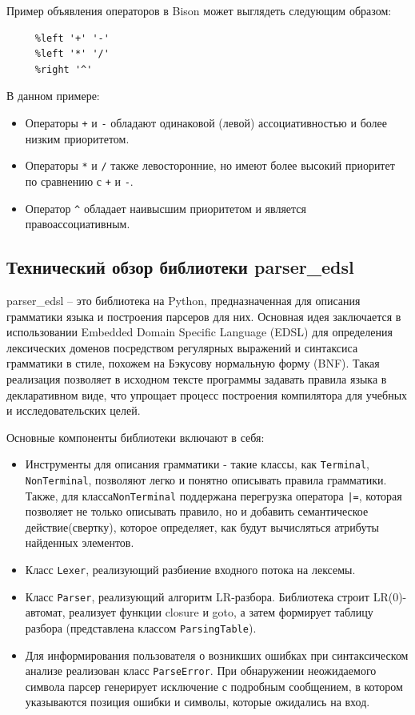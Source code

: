 \documentclass[14pt, russian]{scrartcl}
\begin{document}
Пример объявления операторов в Bison может выглядеть следующим образом:

\begin{verbatim}
	 %left '+' '-'
	 %left '*' '/'
	 %right '^'
\end{verbatim}

В данном примере:
\begin{itemize}
	\item Операторы \verb|+| и \verb|-| обладают одинаковой (левой)
	ассоциативностью и более низким приоритетом.
	\item Операторы \verb|*| и \verb|/| также левосторонние,
	но имеют более высокий приоритет по сравнению с \verb|+| и \verb|-|.
	\item Оператор \verb|^| обладает
	наивысшим приоритетом и является правоассоциативным.
\end{itemize}

\subsection{Технический обзор библиотеки parser\_edsl}

parser\_edsl – это библиотека на Python, предназначенная для описания грамматики языка и построения парсеров для них.
 Основная идея заключается в использовании Embedded Domain Specific Language (EDSL)
для определения лексических доменов посредством регулярных выражений и синтаксиса грамматики в стиле, похожем
на Бэкусову нормальную форму (BNF). Такая реализация позволяет в исходном тексте программы задавать правила
языка в декларативном виде, что упрощает процесс построения компилятора для учебных и исследовательских целей.

Основные компоненты библиотеки включают в себя:

\begin{itemize}
	\item Инструменты для описания грамматики - такие классы, как \texttt{Terminal}, \texttt{NonTerminal}, позволяют легко и понятно описывать правила грамматики.
		Также, для класса\texttt{NonTerminal} поддержана перегрузка оператора \texttt{|=}, которая позволяет не только описывать
		правило, но и добавить семантическое действие(свертку), которое определяет, как будут
		вычисляться атрибуты найденных элементов.
	\item Класс \texttt{Lexer}, реализующий разбиение входного потока на лексемы.
	\item Класс \texttt{Parser}, реализующий алгоритм LR-разбора.  Библиотека строит LR(0)-автомат, реализует
	функции closure и goto, а затем формирует таблицу разбора (представлена классом \texttt{ParsingTable}).
	\item Для информирования пользователя о возникших ошибках при синтаксическом анализе реализован класс \texttt{ParseError}.
	 При обнаружении неожидаемого символа парсер генерирует исключение с подробным сообщением, в
	 котором указываются позиция ошибки и символы, которые ожидались на вход.
\end{itemize}
\end{document}
